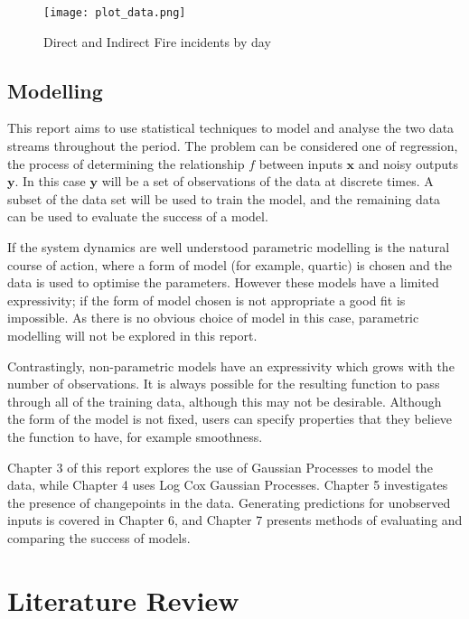 \documentclass[a4paper,11pt]{report}
\begin{document}
\begin{figure}
\centering
\texttt{[image: plot\_data.png]}
\caption{Direct and Indirect Fire incidents by day}
\label{fig:sigactsdata}
\end{figure}

\section{Modelling}

This report aims to use statistical techniques to model and analyse the two data streams throughout the period. The problem can be considered one of regression, the process of determining the relationship \(f\) between inputs \(\mathbf{x}\) and noisy outputs \(\mathbf{y}\). In this case \(\mathbf{y}\) will be a set of observations of the data at discrete times. A subset of the data set will be used to train the model, and the remaining data can be used to evaluate the success of a model. \par

If the system dynamics are well understood parametric modelling is the natural course of action, where a form of model (for example, quartic) is chosen and the data is used to optimise the parameters. However these models have a limited expressivity; if the form of model chosen is not appropriate a good fit is impossible. As there is no obvious choice of model in this case, parametric modelling will not be explored in this report. \par

Contrastingly, non-parametric models have an expressivity which grows with the number of observations. It is always possible for the resulting function to pass through all of the training data, although this may not be desirable. Although the form of the model is not fixed, users can specify properties that they believe the function to have, for example smoothness. \par

Chapter 3 of this report explores the use of Gaussian Processes to model the data, while Chapter 4 uses Log Cox Gaussian Processes. Chapter 5 investigates the presence of changepoints in the data. Generating predictions for unobserved inputs is covered in Chapter 6, and Chapter 7 presents methods of evaluating and comparing the success of models. 

\chapter{Literature Review}
\end{document}
